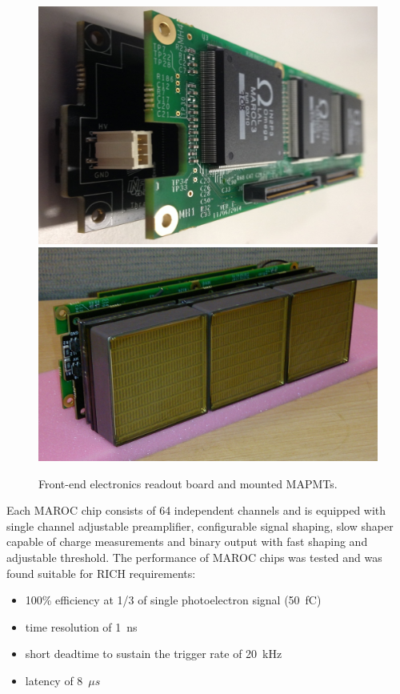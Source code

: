 \begin{figure}[htb]
  \centering
  \includegraphics[width=0.9\linewidth]{figures/fe1.pdf}
  \includegraphics[width=0.9\linewidth]{figures/frontendPMT.pdf}
  \caption{Front-end electronics readout board and mounted MAPMTs.}
  \label{fig:feboards}
\end{figure}

Each MAROC chip consists of 64 independent channels and is equipped with single channel adjustable preamplifier, configurable signal shaping, slow shaper capable of charge measurements and binary output with fast shaping and adjustable threshold.
The performance of MAROC chips was tested and was found suitable for RICH requirements:
\begin{itemize}
	\item 100\% efficiency at 1/3 of single photoelectron signal (50~fC)
	\item time resolution of 1~ns
	\item short deadtime to sustain the trigger rate of 20~kHz
	\item latency of 8~$\mu s$
\end{itemize}

